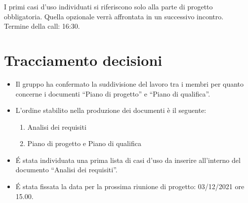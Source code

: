 \noindent I primi casi d'uso individuati si riferiscono solo alla parte di progetto obbligatoria. Quella opzionale verrà affrontata in un successivo incontro. \\

\noindent Termine della call: 16:30.

\section{Tracciamento decisioni}

\begin{itemize}
	\item Il gruppo ha confermato la suddivisione del lavoro tra i membri per quanto concerne i documenti ``Piano di progetto'' e ``Piano di qualifica''.
	\item L'ordine stabilito nella produzione dei documenti è il seguente:
		\begin{enumerate}
		\item Analisi dei requisiti
		\item Piano di progetto e Piano di qualifica
		\end{enumerate}
	\item \' E stata individuata una prima lista di casi d'uso da inserire all'interno del documento ``Analisi dei requisiti''.
	\item \' E stata fissata la data per la prossima riunione di progetto: 03/12/2021 ore 15.00.
\end{itemize}